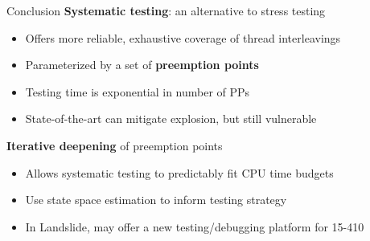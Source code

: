 \documentclass[xcolor=dvipsnames]{beamer}
\begin{document}
\begin{frame}{Conclusion}
	\textbf{Systematic testing}: an alternative to stress testing
	\begin{itemize}
		\item Offers more reliable, exhaustive coverage of thread interleavings
		\item Parameterized by a set of {\bf preemption points}
		\item Testing time is exponential in number of PPs %
		\item State-of-the-art can mitigate explosion, but still vulnerable
	\end{itemize}
	\linegap

	{\bf Iterative deepening} of preemption points
	\begin{itemize}
		\item Allows systematic testing to predictably fit CPU time budgets
		\item Use state space estimation to inform testing strategy
		\item In Landslide, may offer a new testing/debugging platform for 15-410
	\end{itemize}
\end{frame}


\end{document}
